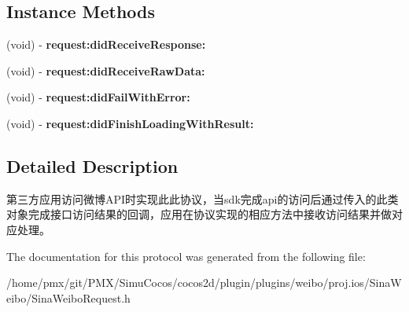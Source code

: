 \subsection*{Instance Methods}
\begin{DoxyCompactItemize}
\item 
\mbox{\label{protocolSinaWeiboRequestDelegate_01-p_a8274e6bd819db03618e220b358db79ec}} 
(void) -\/ {\bfseries request\+:did\+Receive\+Response\+:}
\item 
\mbox{\label{protocolSinaWeiboRequestDelegate_01-p_a9953d725a938e36b774a80c6d82f6d5e}} 
(void) -\/ {\bfseries request\+:did\+Receive\+Raw\+Data\+:}
\item 
\mbox{\label{protocolSinaWeiboRequestDelegate_01-p_a4aa80b9df19e82758c0f7af7ba8f95da}} 
(void) -\/ {\bfseries request\+:did\+Fail\+With\+Error\+:}
\item 
\mbox{\label{protocolSinaWeiboRequestDelegate_01-p_a8708076f72ec2d6f88007add3819886a}} 
(void) -\/ {\bfseries request\+:did\+Finish\+Loading\+With\+Result\+:}
\end{DoxyCompactItemize}


\subsection{Detailed Description}
第三方应用访问微博\+A\+P\+I时实现此此协议，当sdk完成api的访问后通过传入的此类对象完成接口访问结果的回调，应用在协议实现的相应方法中接收访问结果并做对应处理。 

The documentation for this protocol was generated from the following file\+:\begin{DoxyCompactItemize}
\item 
/home/pmx/git/\+P\+M\+X/\+Simu\+Cocos/cocos2d/plugin/plugins/weibo/proj.\+ios/\+Sina\+Weibo/Sina\+Weibo\+Request.\+h\end{DoxyCompactItemize}
